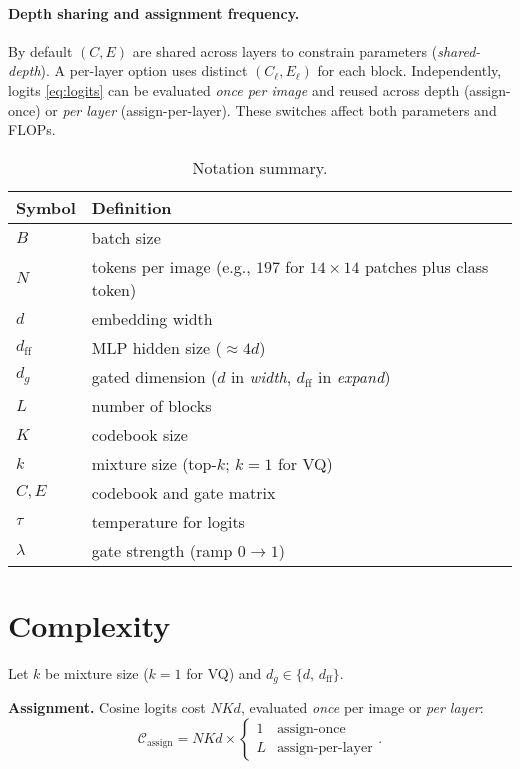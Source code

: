 \documentclass[11pt]{article}
\begin{document}
\paragraph{Depth sharing and assignment frequency.}
By default $(C,E)$ are shared across layers to constrain parameters (\emph{shared-depth}). A per-layer option uses distinct $(C_\ell,E_\ell)$ for each block. Independently, logits \eqref{eq:logits} can be evaluated \emph{once per image} and reused across depth (assign-once) or \emph{per layer} (assign-per-layer). These switches affect both parameters and FLOPs.

\begin{table}[t]
\centering
\begin{threeparttable}
\caption{Notation summary.}
\label{tab:notation}
\begin{tabular}{ll}
\toprule
Symbol & Definition \\
\midrule
$B$ & batch size \\
$N$ & tokens per image (e.g., $197$ for $14\times14$ patches plus class token) \\
$d$ & embedding width \\
$d_{\mathrm{ff}}$ & MLP hidden size ($\approx4d$) \\
$d_g$ & gated dimension ($d$ in \emph{width}, $d_{\mathrm{ff}}$ in \emph{expand}) \\
$L$ & number of blocks \\
$K$ & codebook size \\
$k$ & mixture size (top-$k$; $k{=}1$ for VQ) \\
$C,E$ & codebook and gate matrix \\
$\tau$ & temperature for logits \\
$\lambda$ & gate strength (ramp $0\rightarrow 1$) \\
\bottomrule
\end{tabular}
\end{threeparttable}
\end{table}

\section{Complexity}
\label{sec:complexity}
Let $k$ be mixture size ($k{=}1$ for VQ) and $d_g\in\{d,\,d_{\mathrm{ff}}\}$.

\textbf{Assignment.} Cosine logits cost $NKd$, evaluated \emph{once} per image or \emph{per layer}:
\[
\mathcal{C}_{\mathrm{assign}} = NKd \times
\begin{cases}
1 & \text{assign-once}\\
L & \text{assign-per-layer}
\end{cases}.
\]
\end{document}
